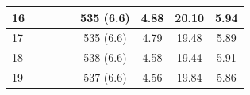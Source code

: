 \begin{table}[]
\begin{tabular}{|l|c|c|c|c|c|c|c|c|}
16                                    &                     &                     &                   &                       & 535 (6.6)   & 4.88                & 20.10             & 5.94                  \\ \hline
17                                    &                     &                     &                   &                       & 535 (6.6)   & 4.79                & 19.48             & 5.89                  \\ \hline
18                                    &                     &                     &                   &                       & 538 (6.6)   & 4.58                & 19.44             & 5.91                  \\ \hline
19                                    &                     &                     &                   &                       & 537 (6.6)   & 4.56                & 19.84             & 5.86                  \\ \hline
\end{tabular}
\end{table}

